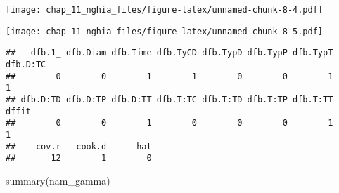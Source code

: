\documentclass[
]{article}
\newenvironment{Shaded}{\begin{snugshade}}{\end{snugshade}}
\newcommand{\AttributeTok}[1]{\textcolor[rgb]{0.77,0.63,0.00}{#1}}
\newcommand{\DecValTok}[1]{\textcolor[rgb]{0.00,0.00,0.81}{#1}}
\newcommand{\FunctionTok}[1]{\textcolor[rgb]{0.00,0.00,0.00}{#1}}
\newcommand{\NormalTok}[1]{#1}
\newcommand{\SpecialCharTok}[1]{\textcolor[rgb]{0.00,0.00,0.00}{#1}}
\newcommand{\StringTok}[1]{\textcolor[rgb]{0.31,0.60,0.02}{#1}}
\begin{document}
\texttt{[image: chap\_11\_nghia\_files/figure-latex/unnamed-chunk-8-4.pdf]}

\begin{Shaded}
\end{Shaded}

\texttt{[image: chap\_11\_nghia\_files/figure-latex/unnamed-chunk-8-5.pdf]}

\begin{Shaded}
\end{Shaded}

\begin{verbatim}
##   dfb.1_ dfb.Diam dfb.Time dfb.TyCD dfb.TypD dfb.TypP dfb.TypT dfb.D:TC 
##        0        0        1        1        0        0        1        1 
## dfb.D:TD dfb.D:TP dfb.D:TT dfb.T:TC dfb.T:TD dfb.T:TP dfb.T:TT    dffit 
##        0        0        1        0        0        0        1        1 
##    cov.r   cook.d      hat 
##       12        1        0
\end{verbatim}

\begin{Shaded}
\begin{Highlighting}[]
\FunctionTok{summary}\NormalTok{(nam\_gamma)}
\end{Highlighting}
\end{Shaded}
\end{document}
